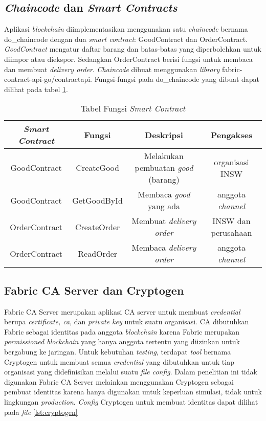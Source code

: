 \subsection{\textit{Chaincode} dan \textit{Smart Contracts}}
\label{subsec:chaincode}
Aplikasi \textit{blockchain} diimplementasikan menggunakan satu \textit{chaincode} bernama do\_chaincode dengan dua \textit{smart contract}: GoodContract dan OrderContract. \textit{GoodContract} mengatur daftar barang dan batas-batas yang diperbolehkan untuk diimpor atau diekspor. Sedangkan OrderContract berisi fungsi untuk membaca dan membuat \textit{delivery order}. \textit{Chaincode} dibuat menggunakan \textit{library} fabric-contract-api-go/contractapi. Fungsi-fungsi pada do\_chaincode yang dibuat dapat dilihat pada tabel \ref{table:smartcontract}. 

\begin{center}
\begin{table}
\begin{tabular}{ |c|c|c|c| } 
 \hline
 \textit{\textbf{Smart Contract}} & \textbf{Fungsi} & \textbf{Deskripsi} & \textbf{Pengakses} \\ 
 \hline
 GoodContract & CreateGood & Melakukan pembuatan \textit{good} (barang) & organisasi INSW \\ 
 \hline
 GoodContract & GetGoodById & Membaca \textit{good} yang ada & anggota \textit{channel} \\ 
 \hline
 OrderContract & CreateOrder & Membuat \textit{delivery order} & INSW dan perusahaan \\
 \hline
 OrderContract & ReadOrder & Membaca \textit{delivery order} & anggota \textit{channel} \\
 \hline
\end{tabular}
\caption{Tabel Fungsi \textit{Smart Contract}}
\label{table:smartcontract}
\end{table}
\end{center}

\subsection{Fabric CA Server dan Cryptogen}
\label{subsec:fabric-ca}
Fabric CA Server merupakan aplikasi CA server untuk membuat \textit{credential} berupa \textit{certificate, ca}, dan \textit{private key} untuk suatu organisasi. CA dibutuhkan Fabric sebagai identitas pada anggota \textit{blockchain} karena Fabric merupakan \textit{permissioned blockchain} yang hanya anggota tertentu yang diizinkan untuk bergabung ke jaringan. Untuk kebutuhan \textit{testing}, terdapat \textit{tool} bernama Cryptogen untuk membuat semua \textit{credential} yang dibutuhkan untuk tiap organisasi yang didefinisikan melalui suatu \textit{file config}. Dalam penelitian ini tidak digunakan Fabric CA Server melainkan menggunakan Cryptogen sebagai pembuat identitas karena hanya digunakan untuk keperluan simulasi, tidak untuk lingkungan \textit{production}. \textit{Config} Cryptogen untuk membuat identitas dapat dilihat pada \textit{file} \ref{lst:cryptogen} 


